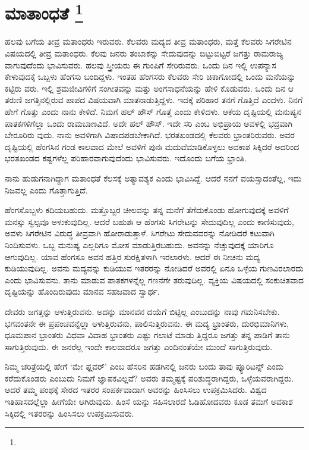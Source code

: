 
\chapter[ಮಾತಾಂಧತೆ ]{ಮಾತಾಂಧತೆ \protect\footnote{}}

ಹಲವು ಬಗೆಯ ತೀವ್ರ ಮತಾಂಧರು ಇರುವರು. ಕೆಲವರು ಮದ್ಯದ ತೀವ್ರ ಮತಾಂಧರು, ಮತ್ತೆ ಕೆಲವರು ಸಿಗರೇಟಿನ ವಿಷಯದಲ್ಲಿ ತೀವ್ರ ಮತಾಂಧರು. ಕೆಲವು ಜನರು ತಂಬಾಕನ್ನು ಸೇದುವುದನ್ನು ಬಿಟ್ಟುಬಿಟ್ಟರೆ ಜಗತ್ತು ರಾಮರಾಜ್ಯ ವಾಗುವುದೆಂದು ಭಾವಿಸುವರು. ಹಲವು ಸ್ತ್ರೀಯರು ಈ ಗುಂಪಿಗೆ ಸೇರಿರುವರು. ಒಂದು ದಿನ ಇಲ್ಲಿ ಉಪನ್ಯಾಸ ಕೇಳುವುದಕ್ಕೆ ಒಬ್ಬಳು ಹೆಂಗಸು ಬಂದಿದ್ದಳು. ಇಂತಹ ಹೆಂಗಸರು ಕೆಲವರು ಸೇರಿ ಚಿಕಾಗೋದಲ್ಲಿ ಒಂದು ಮನೆಯನ್ನು ಕಟ್ಟಿರು ವರು. ಇಲ್ಲಿ ಶ್ರಮಜೀವಿಗಳಿಗೆ ಸಂಗೀತವನ್ನು ಮತ್ತು ಅಂಗಸಾಧನೆಯನ್ನು ಹೇಳಿ ಕೊಡುವರು. ಒಂದು ದಿನ ಆ ತರುಣಿ ಜಗತ್ತಿನಲ್ಲಿರುವ ಪಾಪದ ವಿಷಯವಾಗಿ ಮಾತನಾಡುತ್ತಿದ್ದಳು. ಇದಕ್ಕೆ ಪರಿಹಾರ ತನಗೆ ಗೊತ್ತಿದೆ ಎಂದಳು. ನಿನಗೆ ಹೇಗೆ ಗೊತ್ತು ಎಂದು ನಾನು ಕೇಳಿದೆ. ನಿಮಗೆ ಹಲ್​ ಹೌಸ್​ ಗೊತ್ತೆ ಎಂದು ಕೇಳಿದಳು. ಆಕೆಯ ದೃಷ್ಟಿಯಲ್ಲಿ ಮನುಷ್ಯನ ಪಾತಕಗಳಿಗೆಲ್ಲಾ ಒಂದು ರಾಮಬಾಣವಿದೆ. ಅದೇ ಹಲ್​ ಹೌಸ್​. ಇದೇ ಸರಿ ಎಂಬ ಅಭಿಪ್ರಾಯ ಅವಳಲ್ಲಿ ಭದ್ರವಾಗಿ ಬೇರೂರಿರು ವುದು. ನಾನು ಅವಳಿಗಾಗಿ ವಿಷಾದಪಡಬೇಕಾಗಿದೆ. ಭರತಖಂಡದಲ್ಲಿ ಕೆಲವರು ಭ್ರಾಂತರಿರುವರು. ಅವರ ದೃಷ್ಟಿಯಲ್ಲಿ ಹೆಂಗಸಿನ ಗಂಡ ಕಾಲವಾದ ಮೇಲೆ ಅವಳಿಗೆ ಪುನಃ ಮದುವೆಮಾಡಿಕೊಳ್ಳಲು ಅವಕಾಶ ಸಿಕ್ಕಿದರೆ ಅದರಿಂದ ಭರತಖಂಡದ ಕಷ್ಟಗಳೆಲ್ಲ ಪರಿಹಾರವಾಗುವುದೆಂದು ಭಾವಿಸುವರು. ಇದೊಂದು ಬಗೆಯ ಭ್ರಾಂತಿ.

ನಾನು ಹುಡುಗನಾಗಿದ್ದಾಗ ಮತಾಂಧತೆ ಕೆಲಸಕ್ಕೆ ಅತ್ಯಾವಶ್ಯಕ ಎಂದು ಭಾವಿಸಿದ್ದೆ. ಆದರೆ ನನಗೆ ವಯಸ್ಸಾದಂತೆಲ್ಲ, ಇದು ನಿಜವಲ್ಲ ಎಂದು ಗೊತ್ತಾಗುತ್ತಿದೆ.

ಹೆಂಗಸೊಬ್ಬಳು ಕದಿಯಬಹುದು. ಮತ್ತೊಬ್ಬರ ಚೀಲವನ್ನು ತನ್ನ ಮನೆಗೆ ತೆಗೆದುಕೊಂಡು ಹೋಗುವುದಕ್ಕೆ ಅವಳಿಗೆ ಮನಸ್ಸು ಸ್ವಲ್ಪವೂ ಅಳುಕುವುದಿಲ್ಲ. ಆದರೆ ಬಹುಶಃ ಆ ಹೆಂಗಸು ಸಿಗರೇಟನ್ನು ಸೇದುವುದಿಲ್ಲ ಎಂದು ಕಾಣಿಸುವುದು, ಅವಳು ಸಿಗರೇಟಿನ ವಿರುದ್ಧ ತೀವ್ರವಾಗಿ ಹೋರಾಡುತ್ತಾಳೆ. ಸಿಗರೇಟು ಸೇದುವವರನ್ನು ನೋಡಿದರೆ ಕಟುವಾಗಿ ನಿಂದಿಸುವಳು. ಒಬ್ಬ ಮನುಷ್ಯ ಎಲ್ಲರಿಗೂ ಮೋಸ ಮಾಡುತ್ತಿರಬಹುದು. ಅವನನ್ನು ನೆಚ್ಚುವುದಕ್ಕೆ ಯಾರಿಗೂ ಆಗುವುದಿಲ್ಲ. ಯಾವ ಹೆಂಗಸೂ ಅವನ ಹತ್ತಿರ ಸುರಕ್ಷಿತಳಾಗಿ ಇರಲಾರಳು. ಆದರೆ ಈ ನೀಚನು ಮದ್ಯ ಕುಡಿಯುವುದಿಲ್ಲ. ಅವನು ಮದ್ಯವನ್ನು ಕುಡಿಯುವ ಇತರರನ್ನು ನೋಡಿದರೆ ಅವರಲ್ಲಿ ಏನೂ ಒಳ್ಳೆಯ ಗುಣವಿರಲಾರದು ಎಂದು ಭಾವಿಸುವನು. ತಾನು ಮಾಡುವ ಪಾತಕಗಳನ್ನೆಲ್ಲ ಗಣನೆಗೇ ತರುವುದಿಲ್ಲ. ವ್ಯಕ್ತಿಯ ವಿಷಯದಲ್ಲಿ ಸಂಕುಚಿತವಾದ ದೃಷ್ಟಿಯನ್ನು ಹೊಂದಿರುವುದು ಮಾನವ ಸಹಜವಾದ ಸ್ವಾರ್ಥ.

ದೇವರು ಜಗತ್ತನ್ನು ಆಳುತ್ತಿರುವನು. ಅದನ್ನು ಮಾನವನ ದಯೆಗೆ ಬಿಟ್ಟಿಲ್ಲ ಎಂಬುದನ್ನು ನಾವು ಗಮನಿಸಬೇಕು. ಭಗವಂತನೇ ಈ ಪ್ರಪಂಚವನ್ನೆಲ್ಲಾ ಆಳುತ್ತಿರುವನು, ಪಾಲಿಸುತ್ತಿರುವನು. ಈ ಮದ್ಯ ಭ್ರಾಂತರು, ದುರಭಿಮಾನಿಗಳು, ಧೂಮಪಾನ ಭ್ರಾಂತರು ವಿಧವಾ ವಿವಾಹ ಭ್ರಾಂತರು ಎಷ್ಟು ಗಲಾಟೆ ಮಾಡು ತ್ತಿದ್ದರೂ ಜಗತ್ತು ತನ್ನ ಪಾಡಿಗೆ ತಾನು ಸಾಗುತ್ತಿರುವುದು. ಈ ಜನರೆಲ್ಲ ಇಂದೇ ಕಾಲವಾದರೂ ಜಗತ್ತು ಎಂದಿನಂತೆಯೇ ಮುಂದೆ ಸಾಗುತ್ತಿರುವುದು.

ನಿಮ್ಮ ಚರಿತ್ರೆಯಲ್ಲಿ ಹೇಗೆ ‘ಮೇ ಫ್ಲವರ್​’ ಎಂಬ ಹೆಸರಿನ ಹಡಗಿನಲ್ಲಿ ಜನರು ಬಂದು ತಾವು ಪ್ಯೂರಿಟನ್ಸ್​ ಎಂದು ಕರೆದುಕೊಂಡರು ಎಂಬುದು ನಿಮಗೆ ಜ್ಞಾಪಕವಿಲ್ಲವೆ? ಅವರು ತಮ್ಮಷ್ಟಕ್ಕೆ ಪರಿಶುದ್ಧರಾಗಿದ್ದರು, ಒಳ್ಳೆಯವರಾಗಿದ್ದರು. ಆದರೆ ತಮ್ಮ ಪಂಥಕ್ಕೆ ಸೇರದ ಇತರರ ಸಂಪರ್ಕವಾದಾಗ ಅವರನ್ನು ಹಿಂಸಿಸಲು ಉಪಕ್ರಮಿಸಿದರು. ವಿಶ್ವದ ಇತಿಹಾಸದಲ್ಲೆಲ್ಲಾ ಹೀಗೆಯೇ ಆಗಿರುವುದು. ಹಿಂಸೆ ಯನ್ನು ಸಹಿಸಲಾರದೆ ಓಡಿಹೋದವರು ಕೂಡ ತಮಗೆ ಅವಕಾಶ ಸಿಕ್ಕಿದಲ್ಲಿ ಇತರರನ್ನು ಹಿಂಸಿಸಲು ಉಪಕ್ರಮಿಸುವರು.

